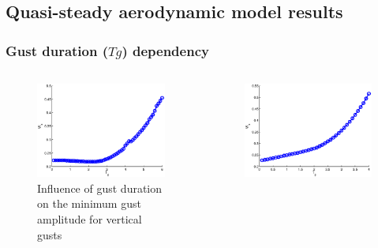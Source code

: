 \documentclass[compress]{beamer}
\begin{document}
\subsection{Quasi-steady aerodynamic model results}

\begin{frame}
  \frametitle{Gust duration ($Tg$) dependency}
  \begin{columns}
    \begin{figure}[h!]
      \begin{center}
	\includegraphics[width=1\textwidth]{./Figures/Wg_vs_TG_windtype=1_alhpamax=12_nodalphalimit.eps}
      \end{center}
      \caption{Influence of gust duration on the minimum gust amplitude for vertical gusts}
      \label{fig:vertical_amplitude_duration}
    \end{figure}
    \begin{figure}[h!]
      \begin{center}
	\includegraphics[width=1\textwidth]{./Figures/Wg_vs_TG_windtype=3_alhpamax=12_nodalphalimit.eps}

\end{center}
\end{figure}
\end{columns}
\end{frame}
\end{document}
